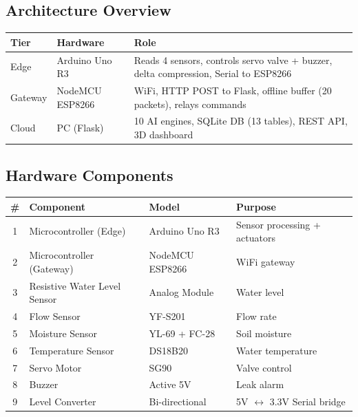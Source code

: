\documentclass[12pt,a4paper]{article}
\begin{document}
\subsection{Architecture Overview}

\begin{table}[H]
\centering
\begin{tabular}{|l|l|p{7.5cm}|}
\hline
\textbf{Tier} & \textbf{Hardware} & \textbf{Role} \\
\hline
Edge & Arduino Uno R3 & Reads 4 sensors, controls servo valve + buzzer, delta compression, Serial to ESP8266 \\
\hline
Gateway & NodeMCU ESP8266 & WiFi, HTTP POST to Flask, offline buffer (20 packets), relays commands \\
\hline
Cloud & PC (Flask) & 10 AI engines, SQLite DB (13 tables), REST API, 3D dashboard \\
\hline
\end{tabular}
\end{table}

\subsection{Hardware Components}

\begin{table}[H]
\centering
\small
\begin{tabular}{|c|l|l|l|}
\hline
\textbf{\#} & \textbf{Component} & \textbf{Model} & \textbf{Purpose} \\
\hline
1 & Microcontroller (Edge) & Arduino Uno R3 & Sensor processing + actuators \\
\hline
2 & Microcontroller (Gateway) & NodeMCU ESP8266 & WiFi gateway \\
\hline
3 & Resistive Water Level Sensor & Analog Module & Water level \\
\hline
4 & Flow Sensor & YF-S201 & Flow rate \\
\hline
5 & Moisture Sensor & YL-69 + FC-28 & Soil moisture \\
\hline
6 & Temperature Sensor & DS18B20 & Water temperature \\
\hline
7 & Servo Motor & SG90 & Valve control \\
\hline
8 & Buzzer & Active 5V & Leak alarm \\
\hline
9 & Level Converter & Bi-directional & 5V $\leftrightarrow$ 3.3V Serial bridge \\
\hline
\end{tabular}
\end{table}
\end{document}

